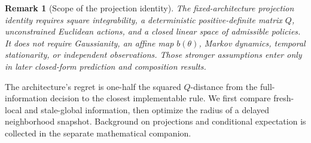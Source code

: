 \documentclass[11pt]{article}
\newtheorem{remark}{Remark}
\begin{document}
\begin{remark}[Scope of the projection identity]
The fixed-architecture projection identity requires square integrability, a
deterministic positive-definite matrix $Q$, unconstrained Euclidean actions,
and a closed linear space of admissible policies. It does not require
Gaussianity, an affine map $b(\theta)$, Markov dynamics, temporal stationarity,
or independent observations. Those stronger assumptions enter only in later
closed-form prediction and composition results.
\end{remark}

The architecture's regret is one-half the squared $Q$-distance from the
full-information decision to the closest implementable rule. We first compare fresh-local and
stale-global information, then optimize the radius of a delayed neighborhood
snapshot. Background on projections and conditional expectation is collected
in the separate mathematical companion.
\end{document}
